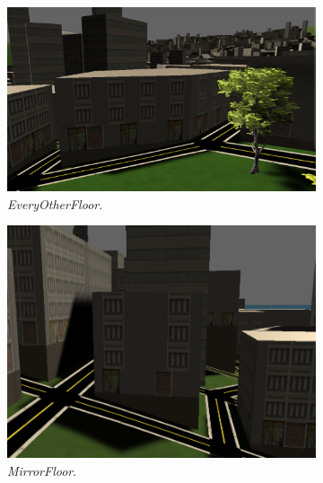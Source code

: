 \begin{figure}[H]
    \centering
  
    \begin{subfigure}[b]{0.25\textwidth}
      \includegraphics[width=\textwidth]{figure/building-every-other.PNG}
      \caption{\textit{EveryOtherFloor}.}
    \end{subfigure}
    \quad
    \begin{subfigure}[b]{0.25\textwidth}
      \includegraphics[width=\textwidth]{figure/building-normal.PNG}
      \caption{\textit{MirrorFloor}.}
    \end{subfigure}
    \quad
    \begin{subfigure}[b]{0.25\textwidth}

\end{subfigure}
\end{figure}
